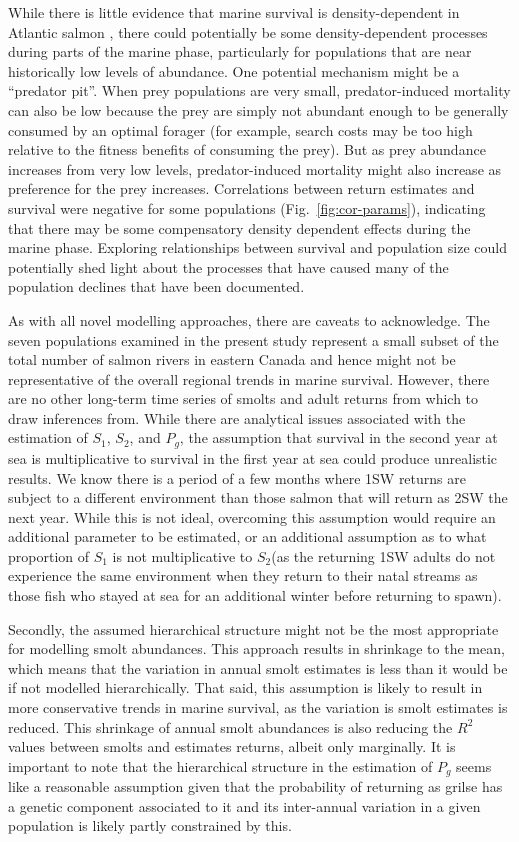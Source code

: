 \documentclass[12pt]{article}
\newcommand{\So}{$S_{1}$\xspace}
\newcommand{\St}{$S_{2}$\xspace}
\newcommand{\Pg}{$P_g$\xspace}
\begin{document}
While there is little evidence that marine survival is density-dependent in
Atlantic salmon \citep{Jonsson1998,Gibson2006}, there could potentially be
some density-dependent processes during parts of the marine phase, 
particularly for populations that are 
near historically low levels of abundance. One potential mechanism might be a
``predator pit''. When prey populations are very small, predator-induced
mortality can also be low because the prey are simply not abundant enough to
be generally consumed by an optimal forager (for example, search costs may be
too high relative to the fitness benefits of consuming the prey). But as prey
abundance increases from very low levels, predator-induced mortality might
also increase as preference for the prey increases. 
Correlations between return estimates and survival were negative for 
some populations (Fig.~\ref{fig:cor-params}),
indicating that there may be some compensatory density dependent effects during the 
marine phase.
Exploring relationships between survival and population size could potentially
shed light about the processes that have caused many of the population
declines that have been documented.


As with all novel modelling approaches, there are caveats to acknowledge.
The seven populations examined in the present study represent a small subset of the total number of salmon rivers in eastern Canada and hence might not be representative
of the overall regional trends in marine survival. However, there are no other
long-term time series of smolts and adult returns from which to draw inferences from.
While there are analytical issues associated with the estimation of \So, \St, and \Pg,
the assumption that survival in the second year at sea is multiplicative to survival in the first 
year at sea could produce unrealistic results.
We know there is a period of a few months where 1SW 
returns are subject to a different environment than those salmon that will
return as 2SW the next year. 
While this is not ideal,
overcoming this assumption would require an additional parameter to be
estimated, or an additional assumption as to what proportion of \So is not
multiplicative to \St (as the returning 1SW adults do not experience the same
environment when they return to their natal streams as those fish who stayed
at sea for an additional winter before returning to spawn).

Secondly, the assumed hierarchical structure might not be the most appropriate
for modelling smolt abundances. This approach results in shrinkage to the
mean, which means that the variation in annual smolt estimates is less than
it would be if not modelled hierarchically. 
That said, this assumption is likely to result in more conservative trends in
marine survival, as the variation is smolt estimates is reduced.
This shrinkage of annual smolt abundances is also reducing the $R^2$ values 
between smolts and estimates returns, albeit only marginally.
It is important to note that the hierarchical structure in the estimation of
\Pg seems like a reasonable assumption given that the probability of returning
as grilse has a genetic component associated to it \citep{Barson2015} and its inter-annual
variation in a given population is likely partly constrained by this.
\end{document}
